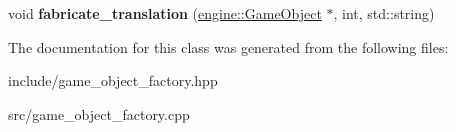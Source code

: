 \begin{DoxyCompactItemize}
\item 
void {\bfseries fabricate\+\_\+translation} (\hyperlink{classengine_1_1_game_object}{engine\+::\+Game\+Object} $\ast$, int, std\+::string)\hypertarget{classmindscape_1_1_game_object_factory_a837ba69fff5aec36da34f152379e4ba5}{}\label{classmindscape_1_1_game_object_factory_a837ba69fff5aec36da34f152379e4ba5}

\end{DoxyCompactItemize}


The documentation for this class was generated from the following files\+:\begin{DoxyCompactItemize}
\item 
include/game\+\_\+object\+\_\+factory.\+hpp\item 
src/game\+\_\+object\+\_\+factory.\+cpp\end{DoxyCompactItemize}

